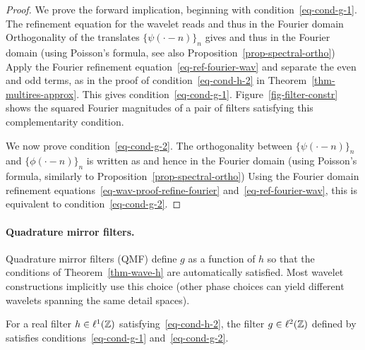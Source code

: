 \begin{proof}
We prove the forward implication, beginning with condition~\eqref{eq-cond-g-1}.
%
The refinement equation for the wavelet reads
and thus in the Fourier domain
Orthogonality of the translates $\{ \psi(\cdot-n) \}_n$ gives
and thus in the Fourier domain (using Poisson's formula, see also Proposition~\ref{prop-spectral-ortho})
Apply the Fourier refinement equation~\eqref{eq-ref-fourier-wav} and separate the even and odd terms, as in the proof of condition~\eqref{eq-cond-h-2} in Theorem~\ref{thm-multires-approx}. This gives condition~\eqref{eq-cond-g-1}.
%
Figure~\ref{fig-filter-constr} shows the squared Fourier magnitudes of a pair of filters satisfying this complementarity condition.



We now prove condition~\eqref{eq-cond-g-2}.
%
The orthogonality between $\{ \psi(\cdot-n) \}_n$ and $\{ \phi(\cdot-n) \}_n$ is written as
and hence in the Fourier domain (using Poisson's formula, similarly to Proposition~\ref{prop-spectral-ortho})
Using the Fourier domain refinement equations~\eqref{eq-wav-proof-refine-fourier} and~\eqref{eq-ref-fourier-wav}, this is equivalent to condition~\eqref{eq-cond-g-2}.
\end{proof}





\paragraph{Quadrature mirror filters.}

Quadrature mirror filters (QMF) define $g$ as a function of $h$ so that the conditions of Theorem~\ref{thm-wave-h} are automatically satisfied. Most wavelet constructions implicitly use this choice (other phase choices can yield different wavelets spanning the same detail spaces).

\begin{prop}
	For a real filter $h\in\ell^1(\mathbb{Z})$ satisfying~\eqref{eq-cond-h-2}, the filter $g \in \ell^2(\mathbb{Z})$ defined by
	satisfies conditions~\eqref{eq-cond-g-1} and~\eqref{eq-cond-g-2}.
\end{prop}

